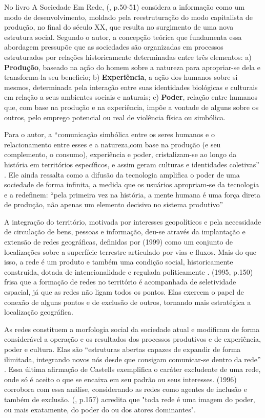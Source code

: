 \documentclass[
	article,			%
	12pt,				%
	oneside,			%
	a4paper,			%
	english,			%
	brazil,				%
	]{abntex2}
\begin{document}
No livro A Sociedade Em Rede,   (\citeyear{castells1999}, p.50-51) considera a informação como um modo de desenvolvimento, moldado pela reestruturação do modo capitalista de produção, no final do século XX, que resulta no surgimento de uma nova estrutura social. Segundo o autor, a concepção teórica que fundamenta essa abordagem pressupõe que as sociedades são organizadas em processos estruturados por relações historicamente determinadas entre três elementos: a) \textbf{Produção}, baseado na ação do homem sobre a natureza para apropriar-se dela e transforma-la seu beneficio; b) \textbf{Experiência}, a ação dos humanos sobre si mesmos, determinada pela interação entre suas identidades biológicas e culturais em relação a seus ambientes sociais e naturais; c) \textbf{Poder}, relação entre humanos que, com base na produção e na experiência, impõe a vontade de alguns sobre os outros, pelo emprego potencial ou real de violência física ou simbólica.

Para o autor, a “comunicação simbólica entre os seres humanos e o relacionamento entre esses e a natureza,com base na produção (e seu complemento, o consumo), experiência e poder, cristalizam-se ao longo da história em territórios específicos, e assim geram culturas e identidades coletivas” \cite[p. 52-53]{castells1999}. Ele ainda ressalta como a difusão da tecnologia amplifica o poder de uma sociedade de forma infinita, a medida que os usuários apropriam-se da tecnologia e a redefinem: “pela primeira vez na história, a mente humana é uma força direta de produção, não apenas um elemento decisivo no sistema produtivo” \cite{castells1999}


A integração do território, motivada por interesses geopolíticos e pela necessidade de circulação de bens, pessoas e informação, deu-se através da implantação e extensão de redes geográficas, definidas por  (1999) como um conjunto de localizações sobre a superfície terrestre articulado por vias e fluxos. Mais do que isso, a rede é um produto e também uma condição social, historicamente construída, dotada de intencionalidade e regulada politicamente \cite{santos1996}.  (1995, p.150) frisa que a formação de redes no território é acompanhada de seletividade espacial, já que as redes não ligam todos os pontos. Elas exercem o papel de conexão de alguns pontos e de exclusão de outros, tornando mais estratégica a localização geográfica.

As redes constituem a morfologia social da sociedade atual e modificam de forma considerável a operação e os resultados dos processos produtivos e de experiência, poder e cultura. Elas são “estruturas abertas capazes de expandir de forma ilimitada, integrando novos nós desde que consigam comunicar-se dentro da rede” \cite[p. 566]{castells1999}. Essa última afirmação de Castells exemplifica o caráter excludente de uma rede, onde só é aceito o que se encaixa em seu padrão ou seus interesses.  (1996) corrobora com essa análise, considerando as redes como agentes de inclusão e também de exclusão.  (\citeyear{raffestin1993}, p.157) acredita que "toda rede é uma imagem do poder, ou mais exatamente, do poder do ou dos atores dominantes".
\end{document}
